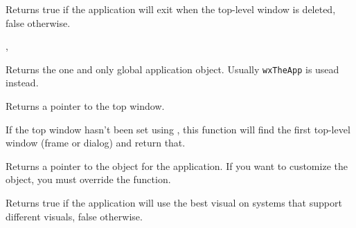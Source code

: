 
Returns true if the application will exit when the top-level window is deleted, false
otherwise.


,\\


\label{wxappgetinstance}


Returns the one and only global application object.
Usually \texttt{wxTheApp} is usead instead.




\label{wxappgettopwindow}


Returns a pointer to the top window.


If the top window hasn't been set using , this
function will find the first top-level window (frame or dialog) and return that.





\label{wxappgettraits}


Returns a pointer to the  object for the application.
If you want to customize the  object, you must override the
 function.



\label{wxappgetusebestvisual}


Returns true if the application will use the best visual on systems that support
different visuals, false otherwise.


